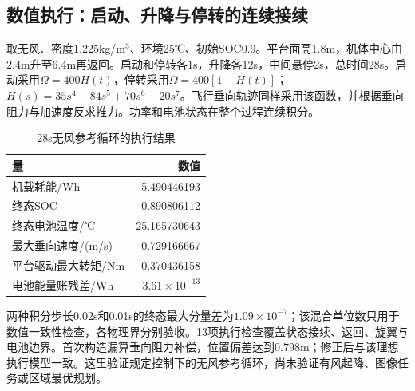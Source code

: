\subsection{数值执行：启动、升降与停转的连续接续}
取无风、密度1.225kg/m$^3$、环境25℃、初始SOC0.9。平台面高1.8m，机体中心由2.4m升至6.4m再返回。启动和停转各1s，升降各12s，中间悬停2s，总时间28s。启动采用$\Omega=400H(t)$，停转采用$\Omega=400[1-H(t)]$；$H(s)=35s^4-84s^5+70s^6-20s^7$。飞行垂向轨迹同样采用该函数，并根据垂向阻力与加速度反求推力。功率和电池状态在整个过程连续积分。
\begin{table}[!ht]\centering\small
\caption{28s无风参考循环的执行结果}\label{s0404:cycle_result}
\begin{tabular}{@{}lr@{}}\toprule
量 & 数值\\\midrule
机载耗能/Wh & 5.490446193\\
终态SOC & 0.890806112\\
终态电池温度/℃ & 25.165730643\\
最大垂向速度/(m/s) & 0.729166667\\
平台驱动最大转矩/Nm & 0.370436158\\
电池能量账残差/Wh & $3.61\times10^{-13}$\\\bottomrule
\end{tabular}\end{table}
两种积分步长0.02s和0.01s的终态最大分量差为$1.09\times10^{-7}$；该混合单位数只用于数值一致性检查，各物理界分别验收。13项执行检查覆盖状态接续、返回、旋翼与电池边界。首次构造漏算垂向阻力补偿，位置偏差达到0.798m；修正后与该理想执行模型一致。这里验证规定控制下的无风参考循环，尚未验证有风起降、图像任务或区域最优规划。
